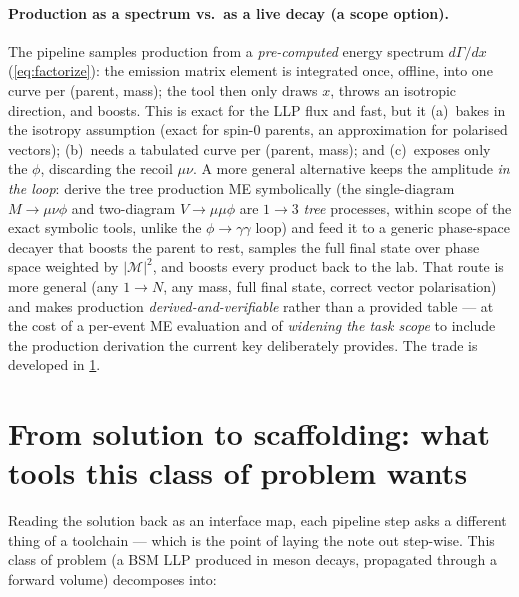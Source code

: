 \documentclass[11pt]{article}
\newcommand{\Ma}{\mathcal{M}}
\begin{document}
\paragraph{Production as a spectrum vs.\ as a live decay (a scope option).} The
pipeline samples production from a \emph{pre-computed} energy spectrum
$d\Gamma/dx$ (\cref{eq:factorize}): the emission matrix element is integrated
once, offline, into one curve per (parent, mass); the tool then only draws $x$,
throws an isotropic direction, and boosts. This is exact for the LLP flux and
fast, but it (a)~bakes in the isotropy assumption (exact for spin-0 parents, an
approximation for polarised vectors); (b)~needs a tabulated curve per (parent,
mass); and (c)~exposes only the $\phi$, discarding the recoil $\mu\nu$. A more
general alternative keeps the amplitude \emph{in the loop}: derive the tree
production ME symbolically (the single-diagram $M\to\mu\nu\phi$ and two-diagram
$V\to\mu\mu\phi$ are $1\to3$ \emph{tree} processes, within scope of the exact
symbolic tools, unlike the $\phi\to\gamma\gamma$ loop) and feed it to a generic
phase-space decayer that boosts the parent to rest, samples the full final state
over phase space weighted by $|\Ma|^2$, and boosts every product back to the lab.
That route is more general (any $1\to N$, any mass, full final state, correct
vector polarisation) and makes production \emph{derived-and-verifiable} rather
than a provided table --- at the cost of a per-event ME evaluation and of
\emph{widening the task scope} to include the production derivation the current
key deliberately provides. The trade is developed in \cref{sec:scaffolding}.

\section{From solution to scaffolding: what tools this class of problem wants}
\label{sec:scaffolding}

Reading the solution back as an interface map, each pipeline step asks a
different thing of a toolchain --- which is the point of laying the note out
step-wise. This class of problem (a BSM LLP produced in meson decays, propagated
through a forward volume) decomposes into:
\end{document}

